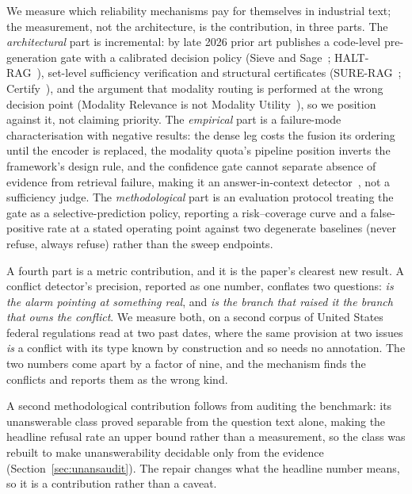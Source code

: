 \documentclass[conference]{IEEEtran}
\begin{document}
We measure which reliability mechanisms pay for themselves in industrial
text; the measurement, not the architecture, is the contribution, in three
parts. The \emph{architectural} part is incremental: by late 2026 prior art
publishes a code-level pre-generation gate with a calibrated decision policy
(Sieve and Sage~\cite{won2026sievesage};
HALT-RAG~\cite{goswami2025haltrag}), set-level sufficiency verification and
structural certificates (SURE-RAG~\cite{qiu2026surerag};
Certify~\cite{zhang2026certify}), and the argument that modality routing is
performed at the wrong decision point (Modality Relevance is not Modality
Utility~\cite{chen2026modalityutility}), so we position against it, not
claiming priority. The
\emph{empirical} part is a failure-mode characterisation with negative
results: the dense leg costs the fusion its ordering until the encoder is
replaced, the modality quota's pipeline position inverts the framework's
design rule, and the confidence gate cannot separate absence of evidence
from retrieval failure, making it an answer-in-context
detector~\cite{li2026relevance}, not a sufficiency judge. The
\emph{methodological} part is an evaluation protocol
treating the gate as a selective-prediction policy, reporting a
risk--coverage curve and a false-positive rate at a stated operating point
against two degenerate baselines (never refuse, always refuse) rather than
the sweep endpoints.

A fourth part is a metric contribution, and it is the paper's clearest new
result. A conflict detector's precision, reported as one number, conflates
two questions: \emph{is the alarm pointing at something real}, and \emph{is
the branch that raised it the branch that owns the conflict}. We measure both,
on a second corpus of United States federal regulations read at two past
dates, where the same provision at two issues \emph{is} a conflict with its
type known by construction and so needs no annotation. The two numbers come
apart by a factor of nine, and the mechanism finds the conflicts and reports
them as the wrong kind.

A second methodological contribution follows from auditing the benchmark:
its unanswerable class proved separable from the question text alone, making
the headline refusal rate an upper bound rather than a measurement, so the
class was rebuilt to make unanswerability decidable only from the evidence
(Section~\ref{sec:unansaudit}). The repair changes what the headline number
means, so it is a contribution rather than a caveat.
\end{document}
